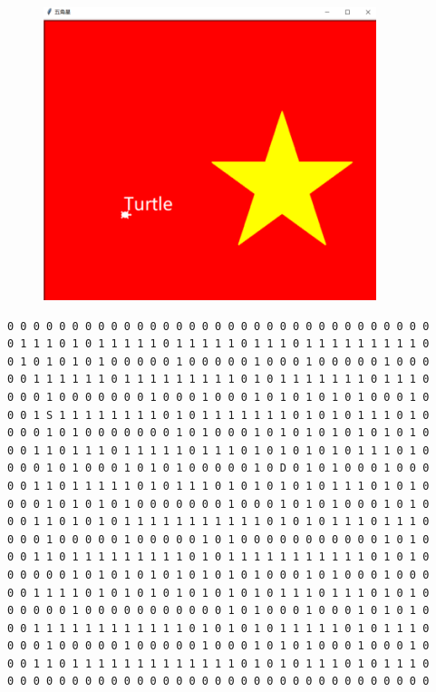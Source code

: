 \begin{tcolorbox}
	\begin{figure}[H]
		\centering
		\includegraphics[]{img/C13/13-6/1.png}
	\end{figure}
\end{tcolorbox}

\vspace{0.5cm}


\begin{lstlisting}[title=maze.txt]
0 0 0 0 0 0 0 0 0 0 0 0 0 0 0 0 0 0 0 0 0 0 0 0 0 0 0 0 0 0 0 0 0
0 1 1 1 0 1 0 1 1 1 1 1 0 1 1 1 1 1 0 1 1 1 0 1 1 1 1 1 1 1 1 1 0
0 1 0 1 0 1 0 1 0 0 0 0 0 1 0 0 0 0 0 1 0 0 0 1 0 0 0 0 0 1 0 0 0
0 0 1 1 1 1 1 1 0 1 1 1 1 1 1 1 1 1 0 1 0 1 1 1 1 1 1 1 0 1 1 1 0
0 0 0 1 0 0 0 0 0 0 0 1 0 0 0 1 0 0 0 1 0 1 0 1 0 1 0 1 0 0 0 1 0
0 0 1 S 1 1 1 1 1 1 1 1 0 1 0 1 1 1 1 1 1 1 0 1 0 1 0 1 1 1 0 1 0
0 0 0 1 0 1 0 0 0 0 0 0 0 1 0 1 0 0 0 1 0 1 0 1 0 1 0 1 0 1 0 1 0
0 0 1 1 0 1 1 1 0 1 1 1 1 1 0 1 1 1 0 1 0 1 0 1 0 1 0 1 1 1 0 1 0
0 0 0 1 0 1 0 0 0 1 0 1 0 1 0 0 0 0 0 1 0 D 0 1 0 1 0 0 0 1 0 0 0
0 0 1 1 0 1 1 1 1 1 0 1 0 1 1 1 0 1 0 1 0 1 0 1 0 1 1 1 0 1 0 1 0
0 0 0 1 0 1 0 1 0 1 0 0 0 0 0 0 0 1 0 0 0 1 0 1 0 1 0 0 0 1 0 1 0
0 0 1 1 0 1 0 1 0 1 1 1 1 1 1 1 1 1 1 1 0 1 0 1 0 1 1 1 0 1 1 1 0
0 0 0 1 0 0 0 0 0 1 0 0 0 0 0 1 0 1 0 0 0 0 0 0 0 0 0 0 0 1 0 1 0
0 0 1 1 0 1 1 1 1 1 1 1 1 1 0 1 0 1 1 1 1 1 1 1 1 1 1 1 0 1 0 1 0
0 0 0 0 0 1 0 1 0 1 0 1 0 1 0 1 0 1 0 1 0 0 0 1 0 1 0 0 0 1 0 0 0
0 0 1 1 1 1 0 1 0 1 0 1 0 1 0 1 0 1 0 1 0 1 1 1 0 1 1 1 0 1 0 1 0
0 0 0 0 0 1 0 0 0 0 0 0 0 0 0 0 0 1 0 1 0 0 0 1 0 0 0 1 0 1 0 1 0
0 0 1 1 1 1 1 1 1 1 1 1 1 1 0 1 0 1 0 1 0 1 1 1 1 1 0 1 0 1 1 1 0
0 0 0 1 0 0 0 0 0 1 0 0 0 0 0 1 0 0 0 1 0 1 0 1 0 0 0 1 0 0 0 1 0
0 0 1 1 0 1 1 1 1 1 1 1 1 1 1 1 1 1 0 1 0 1 0 1 1 1 0 1 0 1 1 1 0
0 0 0 0 0 0 0 0 0 0 0 0 0 0 0 0 0 0 0 0 0 0 0 0 0 0 0 0 0 0 0 0 0
\end{lstlisting}

